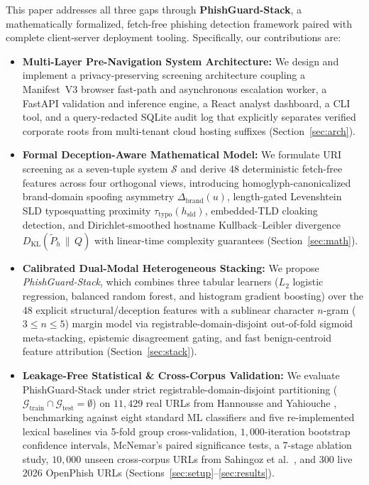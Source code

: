 \documentclass[conference]{IEEEtran}
\begin{document}
This paper addresses all three gaps through \textbf{PhishGuard-Stack}, a mathematically formalized, fetch-free phishing detection framework paired with complete client-server deployment tooling. Specifically, our contributions are:
\begin{itemize}
\item \textbf{Multi-Layer Pre-Navigation System Architecture:} We design and implement a privacy-preserving screening architecture coupling a Manifest~V3 browser fast-path and asynchronous escalation worker, a FastAPI validation and inference engine, a React analyst dashboard, a CLI tool, and a query-redacted SQLite audit log that explicitly separates verified corporate roots from multi-tenant cloud hosting suffixes (Section~\ref{sec:arch}).
\item \textbf{Formal Deception-Aware Mathematical Model:} We formulate URI screening as a seven-tuple system $\mathcal{S}$ and derive 48 deterministic fetch-free features across four orthogonal views, introducing homoglyph-canonicalized brand-domain spoofing asymmetry $\Delta_{\text{brand}}(u)$, length-gated Levenshtein SLD typosquatting proximity $\tau_{\text{typo}}(h_{\text{sld}})$, embedded-TLD cloaking detection, and Dirichlet-smoothed hostname Kullback--Leibler divergence $D_{\text{KL}}(\tilde{P}_h \,\|\, Q)$ with linear-time complexity guarantees (Section~\ref{sec:math}).
\item \textbf{Calibrated Dual-Modal Heterogeneous Stacking:} We propose \textit{PhishGuard-Stack}, which combines three tabular learners ($L_2$ logistic regression, balanced random forest, and histogram gradient boosting) over the 48 explicit structural/deception features with a sublinear character $n$-gram ($3 \le n \le 5$) margin model via registrable-domain-disjoint out-of-fold sigmoid meta-stacking, epistemic disagreement gating, and fast benign-centroid feature attribution (Section~\ref{sec:stack}).
\item \textbf{Leakage-Free Statistical \& Cross-Corpus Validation:} We evaluate PhishGuard-Stack under strict registrable-domain-disjoint partitioning ($\mathcal{G}_{\text{train}} \cap \mathcal{G}_{\text{test}} = \emptyset$) on $11{,}429$ real URLs from Hannousse and Yahiouche \cite{hannousse2021}, benchmarking against eight standard ML classifiers and five re-implemented lexical baselines via 5-fold group cross-validation, $1{,}000$-iteration bootstrap confidence intervals, McNemar's paired significance tests, a 7-stage ablation study, $10{,}000$ unseen cross-corpus URLs from Sahingoz et al.\ \cite{sahingoz2019}, and $300$ live 2026 OpenPhish URLs (Sections~\ref{sec:setup}--\ref{sec:results}).
\end{itemize}
\end{document}
